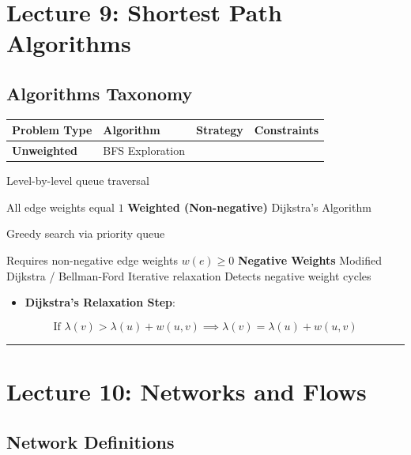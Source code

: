 \documentclass[
]{book}
\newcounter{none} %
\providecommand{\tightlist}{%
  \setlength{\itemsep}{0pt}\setlength{\parskip}{0pt}}
\theoremstyle{definition}
\theoremstyle{definition}
\theoremstyle{definition}
\theoremstyle{definition}
\theoremstyle{remark}
\begin{document}
\section{Lecture 9: Shortest Path Algorithms}\label{lecture-9-shortest-path-algorithms}

\subsection{Algorithms Taxonomy}\label{algorithms-taxonomy}

{\def\LTcaptype{none} %
\begin{longtable}[]{@{}llll@{}}
\toprule\noalign{}
Problem Type & Algorithm & Strategy & Constraints \\
\midrule\noalign{}
\endhead
\bottomrule\noalign{}
\endlastfoot
\textbf{Unweighted} & BFS Exploration & & \\
\end{longtable}
}

\textbar{} Level-by-level queue traversal

\textbar{} All edge weights equal \(1\) \textbar{}
\textbar{} \textbf{Weighted (Non-negative)} \textbar{} Dijkstra's Algorithm

\textbar{} Greedy search via priority queue

\textbar{} Requires non-negative edge weights \(w(e) \ge 0\) \textbar{}
\textbar{} \textbf{Negative Weights} \textbar{} Modified Dijkstra / Bellman-Ford \textbar{} Iterative relaxation \textbar{} Detects negative weight cycles

\textbar{}

\begin{itemize}
\tightlist
\item
  \textbf{Dijkstra's Relaxation Step}:
\end{itemize}

\[\text{If } \lambda(v) > \lambda(u) + w(u, v) \implies \lambda(v) = \lambda(u) + w(u, v)\]

\begin{center}\rule{0.5\linewidth}{0.5pt}\end{center}

\section{Lecture 10: Networks and Flows}\label{lecture-10-networks-and-flows}

\subsection{Network Definitions}\label{network-definitions}
\end{document}
